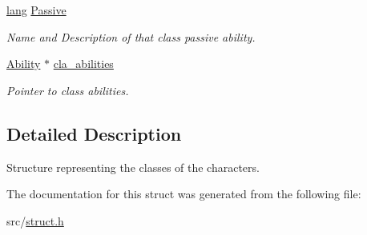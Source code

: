 \begin{DoxyCompactItemize}
\hyperlink{structlang}{lang} \hyperlink{struct_class_a24d1d370cb59a4102cc798d75c7973f2}{Passive}
\begin{DoxyCompactList}\small\item\em Name and Description of that class\textquotesingle{} passive ability. \end{DoxyCompactList}\item 
\mbox{\label{struct_class_acbe95b42d1a383206b091c3510369d82}} 
\hyperlink{struct_ability}{Ability} $\ast$ \hyperlink{struct_class_acbe95b42d1a383206b091c3510369d82}{cla\+\_\+abilities}
\begin{DoxyCompactList}\small\item\em Pointer to class\textquotesingle{} abilities. \end{DoxyCompactList}\end{DoxyCompactItemize}


\subsection{Detailed Description}
Structure representing the classes of the characters. 

The documentation for this struct was generated from the following file\+:\begin{DoxyCompactItemize}
\item 
src/\hyperlink{struct_8h}{struct.\+h}\end{DoxyCompactItemize}
